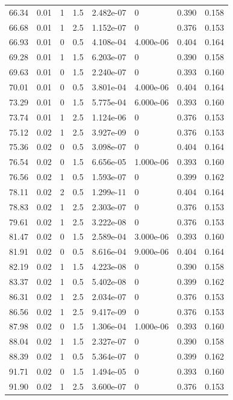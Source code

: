\documentclass[preview]{standalone}
\begin{document}
{{{\begin{tabular}{L{1.2cm}C{1.2cm} C{0.3cm}C{0.5cm} C{1.4cm}C{1.4cm} C{1.4cm}C{1.4cm}}
  66.34  &  0.01  & 1     & 1.5 &  2.482e-07  & 0  & 0.390 &  0.158   \\ 
  66.68  &  0.01  & 1     & 2.5 &  1.152e-07  & 0  & 0.376 &  0.153   \\ 
  66.93  &  0.01  & 0     & 0.5 &  4.108e-04  & 4.000e-06  & 0.404 &  0.164   \\ 
  69.28  &  0.01  & 1     & 1.5 &  6.203e-07  & 0  & 0.390 &  0.158   \\ 
  69.63  &  0.01  & 0     & 1.5 &  2.240e-07  & 0  & 0.393 &  0.160   \\ 
  70.01  &  0.01  & 0     & 0.5 &  3.801e-04  & 4.000e-06  & 0.404 &  0.164   \\ 
  73.29  &  0.01  & 0     & 1.5 &  5.775e-04  & 6.000e-06  & 0.393 &  0.160   \\ 
  73.74  &  0.01  & 1     & 2.5 &  1.124e-06  & 0  & 0.376 &  0.153   \\ 
  75.12  &  0.02  & 1     & 2.5 &  3.927e-09  & 0  & 0.376 &  0.153   \\ 
  75.36  &  0.02  & 0     & 0.5 &  3.098e-07  & 0  & 0.404 &  0.164   \\ 
  76.54  &  0.02  & 0     & 1.5 &  6.656e-05  & 1.000e-06  & 0.393 &  0.160   \\ 
  76.56  &  0.02  & 1     & 0.5 &  1.593e-07  & 0  & 0.399 &  0.162   \\ 
  78.11  &  0.02  & 2     & 0.5 &  1.299e-11  & 0  & 0.404 &  0.164   \\ 
  78.83  &  0.02  & 1     & 2.5 &  2.303e-07  & 0  & 0.376 &  0.153   \\ 
  79.61  &  0.02  & 1     & 2.5 &  3.222e-08  & 0  & 0.376 &  0.153   \\ 
  81.47  &  0.02  & 0     & 1.5 &  2.589e-04  & 3.000e-06  & 0.393 &  0.160   \\ 
  81.91  &  0.02  & 0     & 0.5 &  8.616e-04  & 9.000e-06  & 0.404 &  0.164   \\ 
  82.19  &  0.02  & 1     & 1.5 &  4.223e-08  & 0  & 0.390 &  0.158   \\ 
  83.37  &  0.02  & 1     & 0.5 &  5.402e-08  & 0  & 0.399 &  0.162   \\ 
  86.31  &  0.02  & 1     & 2.5 &  2.034e-07  & 0  & 0.376 &  0.153   \\ 
  86.56  &  0.02  & 1     & 2.5 &  9.417e-09  & 0  & 0.376 &  0.153   \\ 
  87.98  &  0.02  & 0     & 1.5 &  1.306e-04  & 1.000e-06  & 0.393 &  0.160   \\ 
  88.04  &  0.02  & 1     & 1.5 &  2.327e-07  & 0  & 0.390 &  0.158   \\ 
  88.39  &  0.02  & 1     & 0.5 &  5.364e-07  & 0  & 0.399 &  0.162   \\ 
  91.71  &  0.02  & 0     & 1.5 &  1.494e-05  & 0  & 0.393 &  0.160   \\ 
  91.90  &  0.02  & 1     & 2.5 &  3.600e-07  & 0  & 0.376 &  0.153   \\ 
\hline 
\end{tabular} 

}}}
\end{document}
